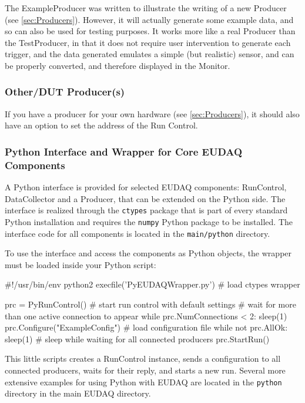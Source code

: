The ExampleProducer was written to illustrate the writing of a new Producer (see \autoref{sec:Producers}).
However, it will actually generate some example data, and so can also be used for testing purposes.
It works more like a real Producer than the TestProducer,
in that it does not require user intervention to generate each trigger,
and the data generated emulates a simple (but realistic) sensor,
and can be properly converted, and therefore displayed in the Monitor.

\subsubsection{Other/DUT Producer(s)}
If you have a producer for your own hardware (see \autoref{sec:Producers}),
it should also have an option to set the address of the Run Control.


\subsubsection{Python Interface and Wrapper for Core EUDAQ Components}
\label{sssec:pywrapper}
A Python interface is provided for selected EUDAQ components:
RunControl, DataCollector and a Producer, that can be extended on the
Python side. The interface is realized through the \texttt{ctypes}
package that is part of every standard Python installation and
requires the \texttt{numpy} Python package to be installed. The
interface code for all components is located in the
\texttt{main/python} directory.

To use the interface and access the components as Python objects, the
wrapper must be loaded inside your Python script:

\begin{listing}[python]
  #!/usr/bin/env python2 
  execfile('PyEUDAQWrapper.py') # load ctypes wrapper

  prc = PyRunControl() # start run control with default settings
  # wait for more than one active connection to appear
  while prc.NumConnections < 2:
      sleep(1)
  prc.Configure("ExampleConfig") # load configuration file
  while not prc.AllOk:
      sleep(1) # sleep while waiting for all connected producers
  prc.StartRun()
\end{listing}

This little scripts creates a RunControl instance, sends a
configuration to all connected producers, waits for their reply, and
starts a new run. Several more extensive examples for using Python
with EUDAQ are located in the \texttt{python} directory in the main
EUDAQ directory.

